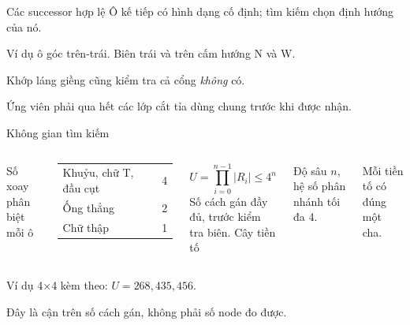 \begin{frame}{Các successor hợp lệ}
Ô kế tiếp có hình dạng cố định; tìm kiếm chọn định hướng của nó.
\vspace{5mm}
\begin{center}
\end{center}
\small Ví dụ ô góc trên-trái. Biên trái và trên cấm hướng N và W.\par
\vspace{4mm}
\normalsize Khớp láng giềng cũng kiểm tra cả cổng \emph{không} có.\par
\small Ứng viên phải qua hết các lớp cắt tỉa dùng chung trước khi được nhận.
\end{frame}

\begin{frame}{Không gian tìm kiếm}
\begin{columns}[T,onlytextwidth]
\small Số xoay phân biệt mỗi ô\par\vspace{3mm}
\begin{tabular}{@{}lr@{}}\toprule
Khuỷu, chữ T, đầu cụt & 4\\
Ống thẳng & 2\\
Chữ thập & 1\\\bottomrule
\end{tabular}
\vspace{4mm}
\normalsize
\[U=\prod_{i=0}^{n-1}|R_i|\leq 4^n\]
\small Số cách gán đầy đủ, trước kiểm tra biên.
\small Cây tiền tố\par\vspace{3mm}
\par\small Độ sâu $n$, hệ số phân nhánh tối đa 4.\par
Mỗi tiền tố có đúng một cha.
\end{columns}
\vspace{4mm}
Ví dụ 4$\times$4 kèm theo: $U=268{,}435{,}456$.\par
\small Đây là cận trên số cách gán, không phải số node đo được.
\end{frame}


